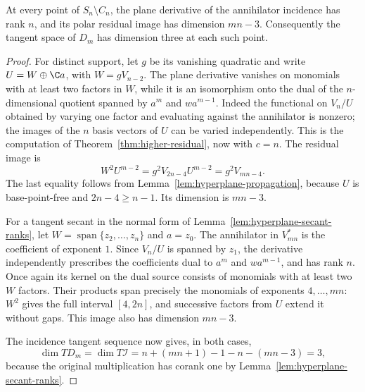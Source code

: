 \begin{lemma}
\label{lem:hyperplane-residual-smoothness}
At every point of $S_n\setminus C_n$, the plane derivative of the
annihilator incidence has rank $n$, and its polar residual image has
dimension $mn-3$. Consequently the tangent space of $D_m$ has
dimension three at each such point.
\end{lemma}
\begin{proof}
For distinct support, let $g$ be its vanishing quadratic and write
$U=W\oplus\C a$, with $W=gV_{n-2}$. The plane derivative vanishes
on monomials with at least two factors in $W$, while it is an
isomorphism onto the dual of the $n$-dimensional quotient spanned by
$a^m$ and $wa^{m-1}$. Indeed the functional on $V_n/U$ obtained by
varying one factor and evaluating against the annihilator is nonzero;
the images of the $n$ basis vectors of $U$ can be varied independently.
This is the computation of Theorem~\ref{thm:higher-residual}, now
with $c=n$. The residual image is
\[
 W^2U^{m-2}=g^2V_{2n-4}U^{m-2}=g^2V_{mn-4}.
\]
The last equality follows from
Lemma~\ref{lem:hyperplane-propagation}, because $U$ is
base-point-free and $2n-4\ge n-1$. Its dimension is $mn-3$.

For a tangent secant in the normal form of
Lemma~\ref{lem:hyperplane-secant-ranks}, let
$W=\operatorname{span}\{z_2,\ldots,z_n\}$ and $a=z_0$.
The annihilator in $V_{mn}^*$ is the coefficient of exponent $1$.
Since $V_n/U$ is spanned by $z_1$, the derivative independently
prescribes the coefficients dual to $a^m$ and $wa^{m-1}$, and has
rank $n$. Once again its kernel on the dual source consists of
monomials with at least two $W$ factors. Their products span precisely
the monomials of exponents $4,\ldots,mn$: $W^2$ gives the full
interval $[4,2n]$, and successive factors from $U$ extend it without
gaps. This image also has dimension $mn-3$.

The incidence tangent sequence now gives, in both cases,
\[
 \dim T D_m=\dim T\mathcal I
      =n+(mn+1)-1-n-(mn-3)=3,
\]
because the original multiplication has corank one by
Lemma~\ref{lem:hyperplane-secant-ranks}.
\end{proof}

